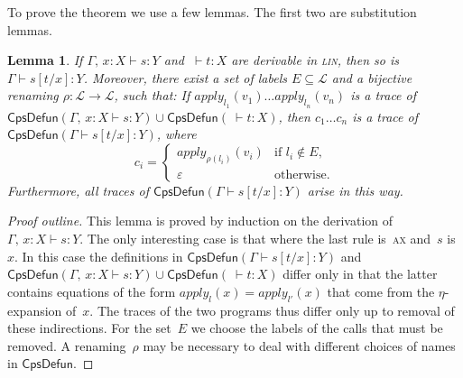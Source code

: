 \documentclass{LMCS}
\theoremstyle{definition}
\theoremstyle{plain}
\newtheorem{lemma}[thm]{Lemma}
\newcommand{\kw}[1]{\mathsf{#1}}
\newcommand{\Capply}{\textit{apply}}
\newcommand{\I}[2]{#1 \colon #2}
\newcommand{\R}[1]{\textsc{#1}}
\newcommand{\SeqTm}[3]{#1 \vdash #2 \colon #3}
\newcommand{\LL}{\mathcal{L}}
\begin{document}
To prove the theorem we use a few lemmas. The first two are
substitution lemmas.

\begin{lemma}
  \label{lem:substcpsdefun}
  If\/ $\SeqTm{\Gamma,\, \I x X}{s}{Y}$ and\/
  $\SeqTm{\ }{t}{X}$ are derivable in \textsc{lin},
  then so is\/
  $\SeqTm{\Gamma}{s[t/x]}{Y}$.
  Moreover,
  there exist a set of labels $E\subseteq \LL$
  and a bijective renaming $\rho\colon \LL \to \LL$,
  such that:
  If $\Capply_{l_1}(v_1)\dots \Capply_{l_n}(v_n)$
  is a trace of 
  $\kw{CpsDefun}(\SeqTm{\Gamma,\, \I x X}{s}{Y})\cup \kw{CpsDefun}(\SeqTm{\ }{t}{X})$,
  then 
  $c_1\dots c_n$
  is a trace of\/
  $\kw{CpsDefun}(\SeqTm{\Gamma}{s[t/x]}{Y})$, where
  \[
    c_i = 
    \begin{cases}
      \Capply_{\rho(l_i)}(v_i) & \text{if $l_i \notin E$,} \\
      \varepsilon & \text{otherwise.}
    \end{cases}
  \]
  Furthermore, all traces of\/ $\kw{CpsDefun}(\SeqTm{\Gamma}{s[t/x]}{Y})$
  arise in this way.
\end{lemma}
\begin{proof}[Proof outline]
This lemma is proved by induction on the derivation of 
$\SeqTm{\Gamma,\, \I x X}{s}{Y}$. 
The only interesting case is that where the
last rule is~\R{ax} and~$s$ is~$x$.
In this case the definitions in
$\kw{CpsDefun}(\SeqTm{\Gamma}{s[t/x]}{Y})$ and
$\kw{CpsDefun}(\SeqTm{\Gamma,\, \I x X}{s}{Y})\cup \kw{CpsDefun}(\SeqTm{\ }{t}{X})$
differ only in that the latter contains equations of the form
$\Capply_{l}(x) = \Capply_{l'}(x)$ that come from the $\eta$-expansion
of~$x$. The traces of the two programs thus differ only up to 
removal of these indirections. For the set~$E$ we choose the labels of
the calls that must be removed. A renaming~$\rho$ may be necessary to
deal with different choices of names in $\kw{CpsDefun}$.
\end{proof}
\end{document}
